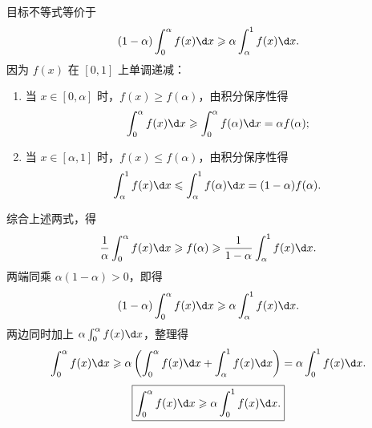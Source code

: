 \begin{solution}
    目标不等式等价于
    \begin{equation}
        (1 - \alpha)\int_0^\alpha f(x)\d x \geqslant \alpha \int_\alpha^1 f(x)\d x.
    \end{equation}
    因为 $f(x)$ 在 $[0, 1]$ 上单调递减：
    \begin{enumerate}
        \item 当 $x \in [0, \alpha]$ 时，$f(x) \geqslant f(\alpha)$，由积分保序性得
              \begin{equation}
                  \int_0^\alpha f(x)\d x \geqslant \int_0^\alpha f(\alpha)\d x = \alpha f(\alpha);
              \end{equation}
        \item 当 $x \in [\alpha, 1]$ 时，$f(x) \leqslant f(\alpha)$，由积分保序性得
              \begin{equation}
                  \int_\alpha^1 f(x)\d x \leqslant \int_\alpha^1 f(\alpha)\d x = (1 - \alpha) f(\alpha).
              \end{equation}
    \end{enumerate}
    综合上述两式，得
    \begin{equation}
        \frac{1}{\alpha}\int_0^\alpha f(x)\d x \geqslant f(\alpha) \geqslant \frac{1}{1 - \alpha}\int_\alpha^1 f(x)\d x.
    \end{equation}
    两端同乘 $\alpha(1 - \alpha) > 0$，即得
    \begin{equation}
        (1 - \alpha)\int_0^\alpha f(x)\d x \geqslant \alpha \int_\alpha^1 f(x)\d x.
    \end{equation}
    两边同时加上 $\alpha \int_0^\alpha f(x)\d x$，整理得
    \begin{equation}
        \int_0^\alpha f(x)\d x \geqslant \alpha \left( \int_0^\alpha f(x)\d x + \int_\alpha^1 f(x)\d x \right) = \alpha \int_0^1 f(x)\d x.
    \end{equation}
    \begin{equation}
        \boxed{\int_0^\alpha f(x) \d x \geqslant \alpha \int_0^1 f(x) \d x.}
    \end{equation}
\end{solution}

